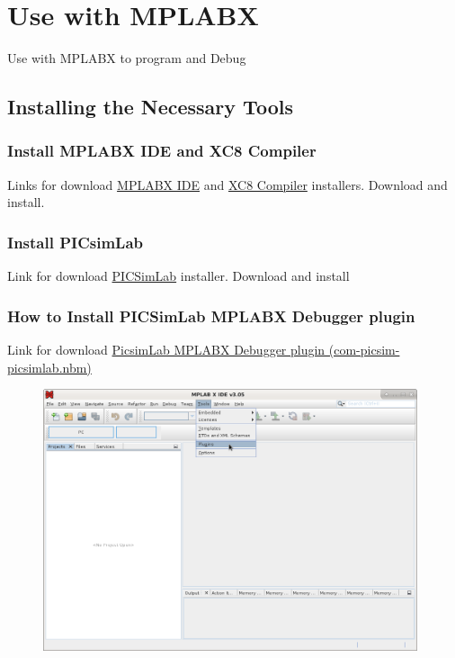 \chapter{Use with MPLABX}

Use with MPLABX to program and Debug

\section{Installing the Necessary Tools}

\subsection{Install MPLABX IDE and XC8 Compiler}
Links for download  \href{http://www.microchip.com/mplabx}{MPLABX IDE} and \href{http://www.microchip.com/compilers}{XC8 Compiler} installers.
Download and install.

\subsection{Install PICsimLab}

Link for download \href{https://github.com/lcgamboa/picsimlab/releases}{PICSimLab} installer. 
Download and install

\subsection{How to Install PICSimLab MPLABX Debugger plugin}

Link for download \href{https://github.com/lcgamboa/picsimlab_md/releases}{PicsimLab MPLABX Debugger plugin (com-picsim-picsimlab.nbm)} 

\begin{figure}[H]
\center
\includegraphics[width=0.98\textwidth]{img/hmd/mplab01.png} 
\end{figure} 

